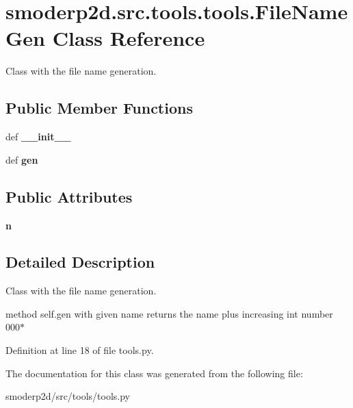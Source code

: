 \hypertarget{classsmoderp2d_1_1src_1_1tools_1_1tools_1_1FileNameGen}{\section{smoderp2d.\-src.\-tools.\-tools.\-File\-Name\-Gen Class Reference}
\label{classsmoderp2d_1_1src_1_1tools_1_1tools_1_1FileNameGen}
}


Class with the file name generation.  


\subsection*{Public Member Functions}
\begin{DoxyCompactItemize}
\item 
\hypertarget{classsmoderp2d_1_1src_1_1tools_1_1tools_1_1FileNameGen_a643b6c519d6395cc62f74e4dcc65cbe5}{def {\bfseries \-\_\-\-\_\-init\-\_\-\-\_\-}}\label{classsmoderp2d_1_1src_1_1tools_1_1tools_1_1FileNameGen_a643b6c519d6395cc62f74e4dcc65cbe5}

\item 
\hypertarget{classsmoderp2d_1_1src_1_1tools_1_1tools_1_1FileNameGen_a6ba5778ecc01d6ab70dbe4b476ab72ca}{def {\bfseries gen}}\label{classsmoderp2d_1_1src_1_1tools_1_1tools_1_1FileNameGen_a6ba5778ecc01d6ab70dbe4b476ab72ca}

\end{DoxyCompactItemize}
\subsection*{Public Attributes}
\begin{DoxyCompactItemize}
\item 
\hypertarget{classsmoderp2d_1_1src_1_1tools_1_1tools_1_1FileNameGen_a5da7416b45adcbab881ab48df88ed49f}{{\bfseries n}}\label{classsmoderp2d_1_1src_1_1tools_1_1tools_1_1FileNameGen_a5da7416b45adcbab881ab48df88ed49f}

\end{DoxyCompactItemize}


\subsection{Detailed Description}
Class with the file name generation. 

method self.\-gen with given name returns the name plus increasing int number 000$\ast$ 

Definition at line 18 of file tools.\-py.



The documentation for this class was generated from the following file\-:\begin{DoxyCompactItemize}
\item 
smoderp2d/src/tools/tools.\-py\end{DoxyCompactItemize}
